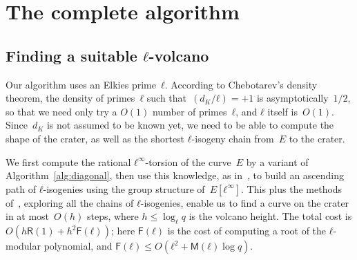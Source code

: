 \documentclass{lms}
\newcommand{\todo}[1]{{\color{red}TODO: #1}}
\def\cout#1{\mathsf{#1}}
\newcommand{\MM}{\cout{M}}
\newcommand{\RR}{\cout{R}}
\begin{document}
\section{The complete algorithm}
\label{sec:complete-algorithm}
\subsection{Finding a suitable $ℓ$-volcano}
\label{sub:shape-volcano}

Our algorithm uses an Elkies prime~$ℓ$.
According to Chebotarev's density theorem,
the density of primes~$ℓ$ such that~$(d_K/ℓ) = +1$ is asymptotically~$1/2$,
so that we need only try a $O(1)$ number of primes~$ℓ$,
and $ℓ$ itself is~$O(1)$.
Since~$d_K$ is not assumed to be known yet,
we need to be able to compute the shape of the crater,
as well as the shortest $ℓ$-isogeny chain from~$E$ to the crater.

We first compute the rational $ℓ^{∞}$-torsion of the curve~$E$
by a variant of Algorithm~\ref{alg:diagonal},
then use this knowledge, as in~\cite{MiretMRV05},
to build an ascending path of $ℓ$-isogenies using
the group structure of~$E[ℓ^{∞}]$.
This plus the methods of~\cite{volcano},
exploring all the chains of $ℓ$-isogenies,
enable us to find a curve on the crater
in at most~$O(h)$ steps, where $h ≤ \log_ℓ q$ is the volcano height.
The total cost is $O(h \RR(1) + h^2 \mathsf{F}(ℓ))$;
here $\mathsf{F}(ℓ)$ is the cost of computing a root
of the $ℓ$-modular polynomial, and $\mathsf{F}(ℓ) ≤ O(ℓ^2 + \MM(ℓ) \log q)$.
\end{document}
